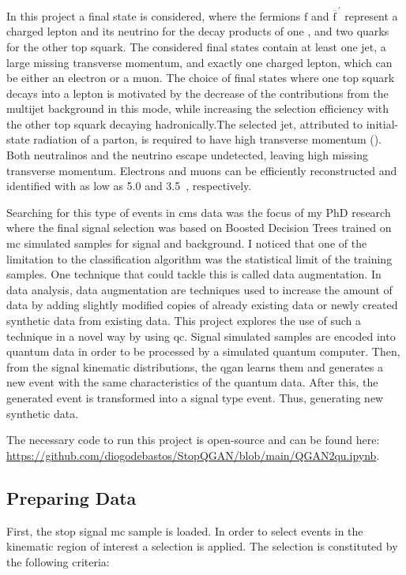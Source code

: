 In this project a final state is considered, where the fermions ${\mathrm{f}}$ 
and $\overline{\mathrm{f}}^{\,\prime}$ represent a charged lepton and its 
neutrino for the decay products of one \stp, and two quarks for the other top 
squark. 
The considered final states contain at least one jet, a large missing transverse
momentum, and exactly one charged lepton, which can be either an electron or a 
muon. The choice of final states where one top squark decays into a lepton is 
motivated by the decrease of the contributions from the multijet background in 
this mode, while increasing the selection efficiency with the other top squark 
decaying hadronically.The selected jet, attributed to initial-state radiation of
a parton, is required to have high transverse momentum (\pt). Both neutralinos 
and the neutrino escape undetected, leaving high missing transverse momentum. 
Electrons and muons can be efficiently reconstructed and identified with \pt as 
low as 5.0 and 3.5~\GeV, respectively. 

Searching for this type of events in \gls{cms} data was the focus of my PhD
research where the final signal selection was based on Boosted Decision Trees 
trained on \gls{mc} simulated samples for signal and background. I noticed that
one of the limitation to the classification algorithm was the statistical limit 
of the training samples. One technique that could tackle this is called data 
augmentation. In data analysis, data augmentation are techniques used to 
increase the amount of data by adding slightly modified copies of already 
existing data or newly created synthetic data from existing data. This project
explores the use of such a technique in a novel way by using \gls{qc}. Signal 
simulated samples are encoded into quantum data in order to be processed by
a simulated quantum computer. Then, from the signal kinematic distributions, the
\gls{qgan} learns them and generates a new event with the same characteristics 
of the quantum data. After this, the generated event is transformed into a 
signal type event. Thus, generating new synthetic data.

The necessary code to run this project is open-source and can be found here:
\url{https://github.com/diogodebastos/StopQGAN/blob/main/QGAN2qu.ipynb}.

\subsection{Preparing Data}
\label{sec:prep}

First, the stop signal \gls{mc} sample is loaded. In order to select events in
the kinematic region of interest a selection is applied. The selection is 
constituted by the following criteria: 

